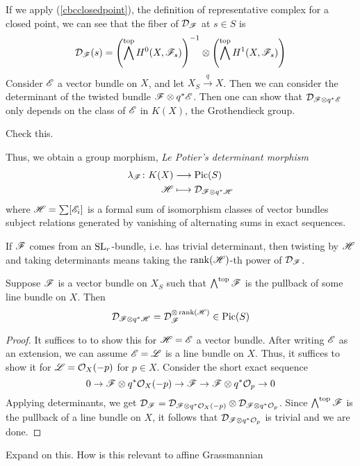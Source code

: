 \documentclass[12pt]{article}
\begin{document}
If we apply (\ref{cbcclosedpoint}), the definition of representative complex for a closed point, we can see that the fiber of $\mathcal{D}_{\mathscr{F}}$ at $s \in S$ is
\[\mathcal{D}_{\mathscr{F}}(s) = \left(\bigwedge^{\text{top}} H^0(X, \mathscr{F}_s)\right)^{-1} \otimes \left(\bigwedge^{\text{top}} H^1(X, \mathscr{F}_s) \right)\]
Consider $\mathscr{E}$ a vector bundle on $X$, and let $X_S \xrightarrow{q} X$. Then we can consider the determinant of the twisted bundle $\mathscr{F} \otimes q^* \mathscr{E}$. Then one can show that $\mathcal{D}_{\mathscr{F} \otimes q^* \mathscr{E}}$ only depends on the class of $\mathscr{E}$ in $K(X)$, the Grothendieck group.
\begin{todo}
    Check this.
\end{todo}
Thus, we obtain a group morphism, \textit{Le Potier's determinant morphism}
\begin{align*}
    \lambda_{\mathscr{F}} \colon K(X) &\longrightarrow \operatorname{Pic}(S) \\
    \mathscr{H} &\longmapsto \mathcal{D}_{\mathscr{F} \otimes q^* \mathscr{H}}
\end{align*}
where $\mathscr{H} = \sum [\mathscr{E}_i]$ is a formal sum of isomorphism classes of vector bundles subject relations generated by vanishing of alternating sums in exact sequences.
\begin{rem}
    If $\mathscr{F}$ comes from an $\operatorname{SL}_r$-bundle, i.e. has trivial determinant, then twisting by $\mathscr{H}$ and taking determinants means taking the $\operatorname{rank}(\mathscr{H})$-th power of $\mathcal{D}_{\mathscr{F}}$.
\end{rem}
\begin{lem}
    Suppose $\mathscr{F}$ is a vector bundle on $X_S$ such that $\bigwedge^{\text{top}} \mathscr{F}$ is the pullback of some line bundle on $X$. Then
    \[\mathcal{D}_{\mathscr{F} \otimes q^* \mathscr{H}} = \mathcal{D}_{\mathscr{F}}^{\otimes \operatorname{rank}(\mathscr{H})} \in \operatorname{Pic}(S)\]
\end{lem}
\begin{proof}
    It suffices to to show this for $\mathscr{H} = \mathscr{E}$ a vector bundle. After writing $\mathscr{E}$ as an extension, we can assume $\mathscr{E} = \mathscr{L}$ is a line bundle on $X$. Thus, it suffices to show it for $\mathscr{L} = \mathcal{O}_X(-p)$ for $p \in X$. Consider the short exact sequence
    \[0 \to \mathscr{F} \otimes q^*\mathcal{O}_X(-p) \to \mathscr{F} \to \mathscr{F} \otimes q^*\mathcal{O}_p \to 0\]
    Applying determinants, we get $\mathcal{D}_{\mathscr{F}} = \mathcal{D}_{\mathscr{F} \otimes q^*\mathcal{O}_X(-p)} \otimes \mathcal{D}_{\mathscr{F} \otimes q^*\mathcal{O}_p}$. Since $\bigwedge^{\text{top}}\mathscr{F}$ is the pullback of a line bundle on $X$, it follows that $\mathcal{D}_{\mathscr{F} \otimes q^*\mathcal{O}_p}$ is trivial and we are done.
\end{proof}
\begin{todo}
    Expand on this. How is this relevant to affine Grassmannian
\end{todo}
\end{document}
